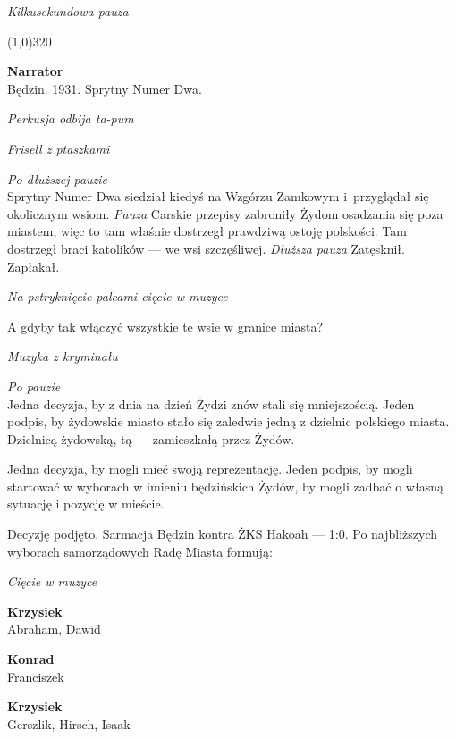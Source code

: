\documentclass[11pt,a4paper,oneside]{article}
\begin{document}
{\color{light-gray} \emph{Kilkusekundowa pauza}}

\line(1,0){320}

 
\textbf{Narrator}\\
Będzin. 1931. Sprytny Numer Dwa. 

{\color{light-gray} \emph{Perkusja odbija ta-pum}}

{\color{light-gray} \emph{Frisell z ptaszkami}}

{\color{light-gray} \emph{Po dłuższej pauzie}}\\
Sprytny Numer Dwa siedział kiedyś na Wzgórzu Zamkowym i~przyglądał się
okolicznym wsiom. {\color{light-gray} \emph{Pauza}} Carskie przepisy
zabroniły Żydom osadzania się poza miastem, więc to tam właśnie
dostrzegł prawdziwą ostoję polskości. Tam dostrzegł braci katolików
--- we wsi szczęśliwej.  {\color{light-gray} \emph{Dłuższa pauza}}
Zatęsknił. Zapłakał.

{\color{light-gray} \emph{Na pstryknięcie palcami cięcie w muzyce}}

A gdyby tak włączyć wszystkie te wsie w granice miasta?

{\color{light-gray} \emph{Muzyka z kryminału}}

{\color{light-gray} \emph{Po pauzie}}\\
Jedna decyzja, by z dnia na dzień Żydzi znów stali się mniejszością.
Jeden podpis, by żydowskie miasto stało się zaledwie jedną z dzielnic
polskiego miasta.  Dzielnicą żydowską, tą --- zamieszkałą przez Żydów. 

Jedna decyzja, by mogli mieć swoją reprezentację. Jeden podpis, by %
mogli startować w wyborach w imieniu będzińskich Żydów, by mogli
zadbać o własną sytuację i pozycję w mieście. 

Decyzję podjęto. Sarmacja Będzin kontra ŻKS Hakoah --- 1:0. Po
najbliższych wyborach samorządowych Radę Miasta formują:

{\color{light-gray} \emph{Cięcie w muzyce}}

{\color{krzysiek}
\textbf{Krzysiek}\\
Abraham, Dawid
}

{\color{konrad}
\textbf{Konrad}\\
Franciszek
}

{\color{krzysiek}
\textbf{Krzysiek}\\
Gerszlik, Hirsch, Isaak
}
\end{document}
